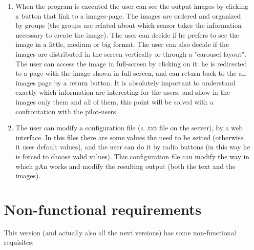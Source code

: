\begin{enumerate}
\item When the program is executed the user can see the output images by clicking a button that link to a images-page. The images are ordered and organized by groups (the groups are related about which sensor takes the information necessary to create the image). The user can decide if he prefers to see the image in a little, medium or big format. The user can also decide if the images are distributed in the screen vertically or through a "carousel layout". The user can access the image in full-screen by clicking on it: he is redirected to a page with the image shown in full screen, and can return back to the all-images page by a return button. It is absolutely important to understand exactly which information are interesting for the users, and show in the images only them and all of them, this point will be solved with a confrontation with the pilot-users. 

\item The user can modify a configuration file (a .txt file on the server), by a web interface. In this files there are some values the need to be setted (otherwise it uses default values), and the user can do it by radio buttons (in this way he is forced to choose valid values). This configuration file can modify the way in which gAn works and modify the resulting output (both the text and the images).   

\end{enumerate}

 
\section{Non-functional requirements}

This version (and actually also all the next versions) has some non-functional requisites:


